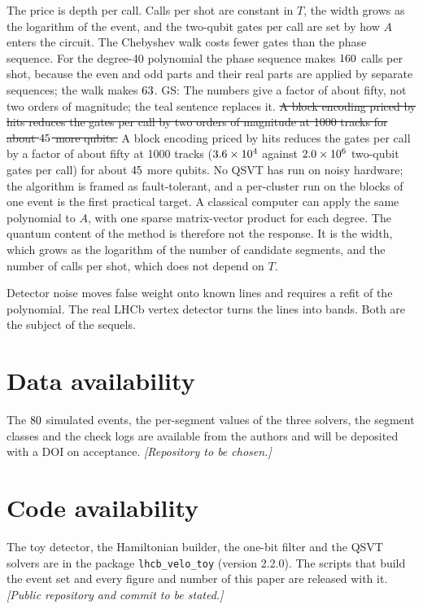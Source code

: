 \documentclass[11pt,a4paper]{article}
\newcommand{\gs}[1]{{\color{orange!85!black} GS: #1 }}
\newcommand{\gss}[1]{{\color{teal} #1}}
\newcommand{\gsx}[1]{{\color{gray}\sout{#1}}}
\begin{document}
The price is depth per call. Calls per shot are constant in $T$, the width grows as the logarithm of
the event, and the two-qubit gates per call are set by how $A$ enters the circuit. The Chebyshev walk
costs fewer gates than the phase sequence. \gss{For the degree-40 polynomial the phase sequence makes $160$ calls per shot, because the even and odd parts and their real parts are applied by separate sequences; the walk makes $63$.} \gs{The numbers give a factor of about fifty, not two orders of magnitude; the teal sentence replaces it.} \gsx{A block encoding priced by hits reduces the gates per
call by two orders of magnitude at 1000 tracks for about $45$ more qubits.} \gss{A block encoding priced by hits reduces the gates per call by a factor of about fifty at 1000 tracks ($3.6\times10^{4}$ against $2.0\times10^{6}$ two-qubit gates per call) for about $45$ more qubits.} No QSVT
has run on noisy hardware; the algorithm is framed as fault-tolerant, and a per-cluster run on the
blocks of one event is the first practical target.
\gss{A classical computer can apply the same polynomial to $A$, with one sparse matrix-vector product for each degree. The quantum content of the method is therefore not the response. It is the width, which grows as the logarithm of the number of candidate segments, and the number of calls per shot, which does not depend on $T$.}

Detector noise moves false weight onto known lines and requires a refit of the polynomial. The
real LHCb vertex detector turns the lines into bands. Both are the subject of the sequels.

\section*{Data availability}
The $80$ simulated events, the per-segment values of the three solvers, the segment
classes and the check logs are available from the authors and will be deposited with a DOI on
acceptance. \textit{[Repository to be chosen.]}

\section*{Code availability}
The toy detector, the Hamiltonian builder, the one-bit filter and the QSVT solvers are in the
package \texttt{lhcb\_velo\_toy} (version 2.2.0). The scripts that build the event set and every
figure and number of this paper are released with it. \textit{[Public repository and commit to be
stated.]}
\end{document}
